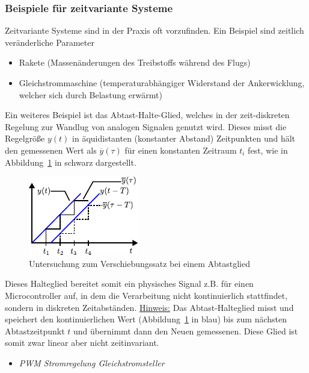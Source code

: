 \subsubsection{Beispiele für zeitvariante Systeme}
%
Zeitvariante Systeme sind in der Praxis oft vorzufinden. Ein Beispiel sind zeitlich veränderliche Parameter \cite{Unbehauen08}
\begin{itemize}
	\item Rakete (Massenänderungen des Treibstoffs während des Flugs)
	\item Gleichstrommaschine (temperaturabhängiger Widerstand der Ankerwicklung, welcher sich durch Belastung erwärmt)
\end{itemize}
%
Ein weiteres Beispiel ist das Abtast-Halte-Glied, welches in der zeit-diskreten Regelung zur Wandlug von analogen Signalen genutzt wird. Dieses misst die Regelgröße $y(t)$ in äquidistanten (konstanter Abstand) Zeitpunkten \cite{Foellinger94} und hält den gemessenen Wert als $\overline{y}(\tau)$ für einen konstanten Zeitraum $t_{i}$ fest, wie in Abbildung~\ref{fig:abtastglied} in schwarz dargestellt.
%
\begin{figure}[h]
	\centering
	\includegraphics[width=0.4\linewidth]{Abbildungen/Modellbildung/PDF/Abtastglied.pdf}
	\caption{Untersuchung zum Verschiebungssatz bei einem Abtastglied}
	\label{fig:abtastglied}
\end{figure}
%
Dieses Halteglied bereitet somit ein physisches Signal z.B. für einen Microcontroller auf, in dem die Verarbeitung nicht kontinuierlich stattfindet, sondern in diskreten Zeitabständen. \underline{Hinweis:} Das Abtast-Halteglied misst und speichert den kontinuierlichen Wert (Abbildung~\ref{fig:abtastglied} in blau) bis zum nächsten Abtastzeitpunkt $t$ und übernimmt dann den Neuen gemessenen. Diese Glied ist somit zwar linear aber nicht zeitinvariant.
%
%
\begin{Aufgaben}{}{}
	\begin{itemize}
		\item \textit{PWM Stromregelung Gleichstromsteller}
	\end{itemize}
\end{Aufgaben}
%
